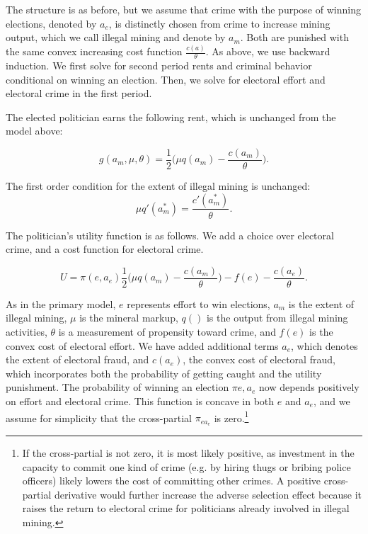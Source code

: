 The structure is as before, but we assume that crime with the purpose
of winning elections, denoted by $a_e$, is distinctly chosen from
crime to increase mining output, which we call illegal mining and
denote by $a_m$. Both are punished with the same convex increasing
cost function $\frac{c(a)}{\theta}$. As above, we use backward
induction. We first solve for second period rents and criminal behavior
conditional on winning an election. Then, we solve for electoral
effort and electoral crime in the first period.

The elected politician earns the following rent, which is unchanged
from the model above:

\begin{equation}
g(a_m,\mu,\theta) = \frac{1}{2} \big(\mu q(a_m) -
\frac{c(a_m)}{\theta}\big)\text{.}
\end{equation}

The first order condition for the extent of illegal mining is unchanged:
\begin{equation}
\mu q'(a_m^*)=\frac{c'(a_m^*)}{\theta}\text{.}
\end{equation}

The politician's utility function is as follows. We add a
choice over electoral crime, and a cost function for electoral crime.

\begin{equation}
U = \pi(e,a_e)\frac{1}{2} \big(\mu q(a_m) -
\frac{c(a_m)}{\theta}\big) - f(e) - \frac{c(a_e)}{\theta}\text{.}
\end{equation}

As in the primary model, $e$ represents effort to win elections, $a_m$
is the extent of illegal mining, $\mu$ is the mineral markup, $q()$ is
the output from illegal mining activities,
$\theta$ is a measurement of propensity toward crime, and $f(e)$ is
the convex cost of electoral effort. We have added additional terms
$a_e$, which denotes the extent of electoral fraud, and $c(a_e)$, the
convex cost of electoral fraud, which incorporates both the
probability of getting caught and the utility punishment. The
probability of winning an election $\pi{e,a_e}$ now depends positively
on effort and electoral crime. This function is concave in both $e$
and $a_e$, and we assume for simplicity that the cross-partial
$\pi_{ea_e}$ is zero.\footnote{If the cross-partial is not zero, it is
  most likely positive, as investment in the capacity to commit one
  kind of crime (e.g. by hiring thugs or bribing police officers)
  likely lowers the cost of committing other crimes. A positive
  cross-partial derivative would further increase the adverse
  selection effect because it raises the return to electoral
  crime for politicians already involved in illegal mining.}

